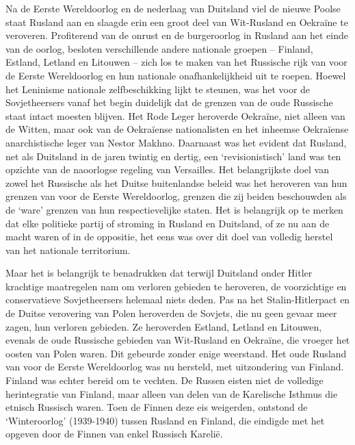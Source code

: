 \documentclass[
  a5paper,
  smalldemyvopaper,10pt,twoside,onecolumn,openright,extrafontsizes,hidelinks]{memoir}
\begin{document}
Na de Eerste Wereldoorlog en de nederlaag van Duitsland viel de nieuwe
Poolse staat Rusland aan en slaagde erin een groot deel van Wit-Rusland
en Oekraïne te veroveren. Profiterend van de onrust en de burgeroorlog
in Rusland aan het einde van de oorlog, besloten verschillende andere
nationale groepen -- Finland, Estland, Letland en Litouwen -- zich los
te maken van het Russische rijk van voor de Eerste Wereldoorlog en hun
nationale onafhankelijkheid uit te roepen. Hoewel het Leninisme
nationale zelfbeschikking lijkt te steunen, was het voor de
Sovjetheersers vanaf het begin duidelijk dat de grenzen van de oude
Russische staat intact moesten blijven. Het Rode Leger heroverde
Oekraïne, niet alleen van de Witten, maar ook van de Oekraïense
nationalisten en het inheemse Oekraïense anarchistische leger van Nestor
Makhno. Daarnaast was het evident dat Rusland, net als Duitsland in de
jaren twintig en dertig, een `revisionistisch' land was ten opzichte van
de naoorlogse regeling van Versailles. Het belangrijkste doel van zowel
het Russische als het Duitse buitenlandse beleid was het heroveren van
hun grenzen van voor de Eerste Wereldoorlog, grenzen die zij beiden
beschouwden als de `ware' grenzen van hun respectievelijke staten. Het
is belangrijk op te merken dat elke politieke partij of stroming in
Rusland en Duitsland, of ze nu aan de macht waren of in de oppositie,
het eens was over dit doel van volledig herstel van het nationale
territorium.

Maar het is belangrijk te benadrukken dat terwijl Duitsland onder Hitler
krachtige maatregelen nam om verloren gebieden te heroveren, de
voorzichtige en conservatieve Sovjetheersers helemaal niets deden. Pas
na het Stalin-Hitlerpact en de Duitse verovering van Polen heroverden de
Sovjets, die nu geen gevaar meer zagen, hun verloren gebieden. Ze
heroverden Estland, Letland en Litouwen, evenals de oude Russische
gebieden van Wit-Rusland en Oekraïne, die vroeger het oosten van Polen
waren. Dit gebeurde zonder enige weerstand. Het oude Rusland van voor de
Eerste Wereldoorlog was nu hersteld, met uitzondering van Finland.
Finland was echter bereid om te vechten. De Russen eisten niet de
volledige herintegratie van Finland, maar alleen van delen van de
Karelische Isthmus die etnisch Russisch waren. Toen de Finnen deze eis
weigerden, ontstond de `Winteroorlog' (1939-1940) tussen Rusland en
Finland, die eindigde met het opgeven door de Finnen van enkel Russisch
Karelië.
\end{document}
